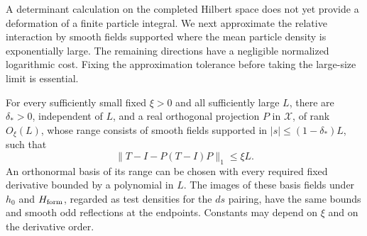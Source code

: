 A determinant calculation on the completed Hilbert space does not yet
provide a deformation of a finite particle integral. We next approximate
the relative interaction by smooth fields supported where the mean
particle density is exponentially large. The remaining directions have
a negligible normalized logarithmic cost. Fixing the approximation
tolerance before taking the large-size limit is essential.

\begin{lemma}\label{lem:03-core}\label{E:finite-core}
For every sufficiently small fixed \(\xi>0\) and all sufficiently
large \(L\), there are \(\delta_*>0\), independent of \(L\), and a
real orthogonal projection \(P\) in \(\mathcal X\), of rank \(O_\xi(L)\),
whose range consists of smooth fields supported in
\(|s|\le(1-\delta_*)L\), such that
\begin{equation}
 \|T-I-P(T-I)P\|_1\le\xi L.
 \label{eq:G-10}
\end{equation}
An orthonormal basis of its range can be chosen with every required
fixed derivative bounded by a polynomial in \(L\). The images of these
basis fields under \(h_0\) and \(H_{\rm form}\), regarded as test
densities for the \(ds\) pairing, have the same bounds and smooth odd
reflections at the endpoints. Constants may depend on \(\xi\) and on
the derivative order.
\end{lemma}
